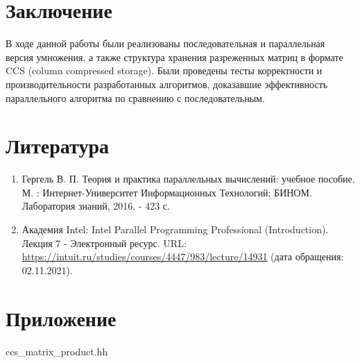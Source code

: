 \documentclass{report}
\begin{document}
\clearpage

\section*{Заключение}

\par В ходе данной работы были реализованы последовательная и параллельная версия умножения, а также структура хранения разреженных матриц в формате CCS (column compressed storage). Были проведены тесты корректности и производительности разработанных алгоритмов, доказавшие эффективность параллельного алгоритма по сравнению с последовательным.

\clearpage

\section*{Литература}

\begin{enumerate}
\item Гергель В. П. Теория и практика параллельных вычислений: учебное пособие. М. : Интернет-Университет Информационных Технологий; БИНОМ. Лаборатория знаний, 2016. - 423 с.
\item Академия Intel: Intel Parallel Programming Professional (Introduction). Лекция 7 - Электронный ресурс. URL: \url{https://intuit.ru/studies/courses/4447/983/lecture/14931} (дата обращения: 02.11.2021).
\end{enumerate} 

\clearpage

\section*{Приложение}

ccs\_matrix\_product.hh
\end{document}
